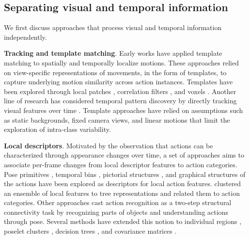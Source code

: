 \subsection{Separating visual and temporal information}
\label{sec:modeling::separate}
We first discuss approaches that process visual and temporal information independently. 

\noindent
\textbf{Tracking and template matching}. Early works  have applied template matching to spatially and temporally localize motions. These approaches relied on view-specific representations of movements, in the form of templates, to capture underlying motion similarity across action instances. Templates have been explored through local patches , correlation filters , and voxels . Another line of research has considered temporal pattern discovery by directly tracking visual features over time . Template approaches have relied on assumptions such as static backgrounds, fixed camera views, and linear motions that limit the exploration of intra-class variability.


\noindent
\textbf{Local descriptors}. Motivated by the observation that actions can be characterized through appearance changes over time, a set of approaches aims to associate per-frame changes from local descriptor features to action categories. Pose primitives , temporal bins , pictorial structures , and graphical structures of the actions  have been explored as descriptors for local action features.  clustered an ensemble of local features to tree representations and related them to action categories. Other approaches  cast action recognition as a two-step structural connectivity task by recognizing parts of objects and understanding actions through pose.
Several methods have extended this notion to individual regions , poselet clusters , decision trees , and covariance matrices .

